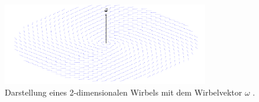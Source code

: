\begin{figure}
\centering
\includegraphics[width=0.8\textwidth]{papers/wirbelringe/fig/flacher_wirbel.pdf}
\caption{Darstellung eines 2-dimensionalen Wirbels mit dem Wirbelvektor \(\omega\) \label{Wirbelringe:fig:flacher_wirbel}.}
\end{figure}